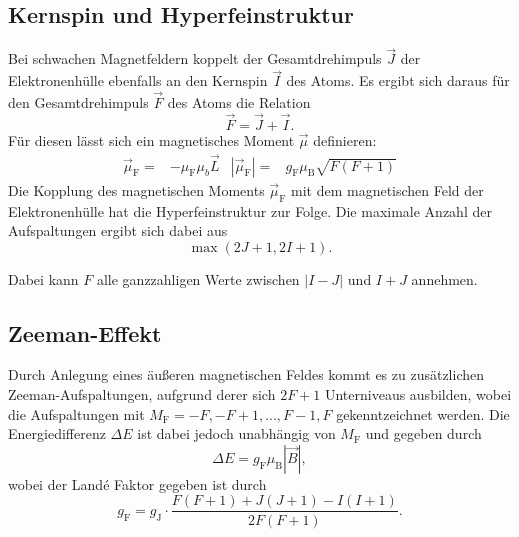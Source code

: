 \subsection{Kernspin und Hyperfeinstruktur}
Bei schwachen Magnetfeldern koppelt der Gesamtdrehimpuls $\vec{J}$ der Elektronenhülle ebenfalls an den Kernspin $\vec{I}$ des Atoms. Es ergibt sich daraus für den Gesamtdrehimpuls $\vec{F}$ des Atoms die Relation
\begin{equation}
  \vec{F} = \vec{J} + \vec{I} \text{.}
\end{equation}
Für diesen lässt sich ein magnetisches Moment $\vec{\mu}$ definieren:
\begin{align}
  \vec{\mu}_\text{F} =& - \mu_\text{F} \mu_{b} \vec{L} & \left| \vec{\mu}_\text{F} \right| =& g_\text{F} \mu_\text{B} \sqrt{F \left( F + 1\right)}
\end{align}
Die Kopplung des magnetischen Moments $\vec{\mu}_\text{F}$ mit dem magnetischen Feld der Elektronenhülle  hat die Hyperfeinstruktur zur Folge. Die maximale Anzahl der Aufspaltungen ergibt sich dabei aus
\begin{equation}
  \max{\left(2 J+1, 2 I+1 \right)} \text{.}
\end{equation}

Dabei kann $F$ alle ganzzahligen Werte zwischen $\left| I - J \right|$ und $ I + J $ annehmen.
\subsection{Zeeman-Effekt}
Durch Anlegung eines äußeren magnetischen Feldes kommt es zu zusätzlichen Zeeman-Aufspaltungen, aufgrund derer sich $2F+1$ Unterniveaus ausbilden, wobei die Aufspaltungen mit $M_\text{F}=-F, -F+1, ..., F-1, F$ gekenntzeichnet werden. Die Energiedifferenz $\Delta E$ ist dabei jedoch unabhängig von $M_\text{F}$ und gegeben durch
\begin{equation}
  \Delta E = g_\text{F} \mu_\text{B} \left| \vec{B} \right| ,
\end{equation}
wobei der Land\'e Faktor gegeben ist durch
\begin{equation}
  g_\text{F} = g_\text{J} \cdot \frac{F \left( F + 1 \right) + J \left( J + 1 \right) - I \left( I + 1 \right)}{2 F\left( F + 1 \right)} \label{eq:g_F}.
\end{equation}


